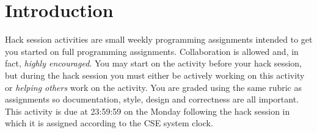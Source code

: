 \section*{Introduction}

Hack session activities are small weekly programming assignments intended
to get you started on full programming assignments.  Collaboration is allowed
and, in fact, \emph{highly encouraged}.  You may start on the activity before
your hack session, but during the hack session you must either be actively 
working on this activity or \emph{helping others} work on the activity.
You are graded using the same rubric as assignments so documentation, style, 
design and correctness are all important.  This activity is due at 23:59:59
on the Monday following the hack session in which it is assigned according
to the CSE system clock.


